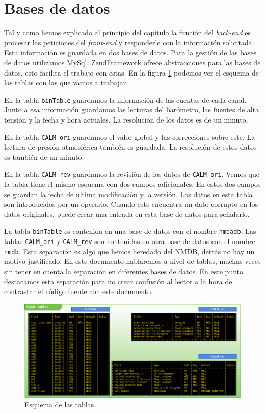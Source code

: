 \section{Bases de datos}
	Tal y como hemos explicado al principio del capítulo la función del \emph{back-end} es  procesar las peticiones del \emph{front-end} y
	responderle con la información solicitada. Esta información es guardada en dos bases de datos. Para la gestión de las bases de datos
	utilizamos MySql\cite{MySql}. ZendFramework ofrece abstracciones para las bases de datos, esto facilita el trabajo con estas. En la
	figura \ref{fig:tablas} podemos ver el esquema de las tablas con las que vamos a trabajar.
	\par
	En la tabla \texttt{binTable} guardamos la información de las cuentas de cada canal. Junto a esa información guardamos las lecturas del
	barómetro, las fuentes de alta tensión y la fecha y hora actuales. La resolución de los datos es de un minuto.
	\par
	En la tabla \texttt{CALM\_ori} guardamos el valor global y  las correcciones sobre este. La lectura de presión atmosférica también es guardada.
	La resolución de estos datos es también de un minuto.
	\par
	En la tabla \texttt{CALM\_rev} guardamos la revisión de los datos de \texttt{CALM\_ori}. Vemos que la tabla tiene el mismo esquema con dos
	campos adicionales. En estos dos campos se guardan la fecha de última modificación y la versión. Los datos en esta tabla son introducidos por
	un operario. Cuando este encuentra un dato corrupto en los datos originales, puede crear una entrada en esta base de datos para señalarlo.
	\par
	La tabla \texttt{binTable} es contenida en una base de datos con el nombre \texttt{nmdadb}. Las tablas \texttt{CALM\_ori} y \texttt{CALM\_rev}
	son contenidas en otra base de datos con el nombre \texttt{nmdb}. Esta separación es algo que hemos heredado del NMDB, detrás no hay un motivo
	justificado. En este documento hablaremos a nivel de tablas, muchas veces sin tener en cuenta la separación en diferentes bases de datos. En
	este punto destacamos esta separación para no crear confusión al lector a la hora de contrastar el código fuente con este documento. 
	\begin{figure}[h]
		\centering
		\includegraphics[keepaspectratio, width=1\textwidth]{./img/tablas.png}
		\caption{Esquema de las tablas.}
		\label{fig:tablas}
	\end{figure}
